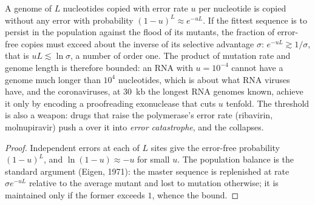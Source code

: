 \begin{proposition}\label{prop:b3:virology:error-threshold}
A genome of $L$ nucleotides copied with error rate $u$ per nucleotide is
copied without any error with probability $(1-u)^{L} \approx e^{-uL}$.
If the fittest sequence is to persist in the population against the
flood of its mutants, the fraction of error-free copies must exceed
about the inverse of its selective advantage $\sigma$: $e^{-uL} \gtrsim
1/\sigma$, that is $uL \lesssim \ln\sigma$, a number of order one. The
product of mutation rate and genome length is therefore bounded: an
RNA  with $u = 10^{-4}$ cannot have a genome much longer than
$10^{4}$ nucleotides, which is about what RNA viruses have, and the
coronaviruses, at \qty{30}{kb} the longest RNA genomes known, achieve it
only by encoding a proofreading exonuclease that cuts $u$ tenfold. The
threshold is also a weapon: drugs that raise the polymerase's error rate
(ribavirin, molnupiravir) push a  over it into \emph{error
catastrophe}, and the  collapses.
\end{proposition}
\begin{proof}
Independent errors at each of $L$ sites give the error-free probability
$(1-u)^{L}$, and $\ln(1-u) \approx -u$ for small $u$. The population
balance is the standard  argument (Eigen, 1971): the master
sequence is replenished at rate $\sigma e^{-uL}$ relative to the average
mutant and lost to mutation otherwise; it is maintained only if the
former exceeds $1$, whence the bound.
\end{proof}

